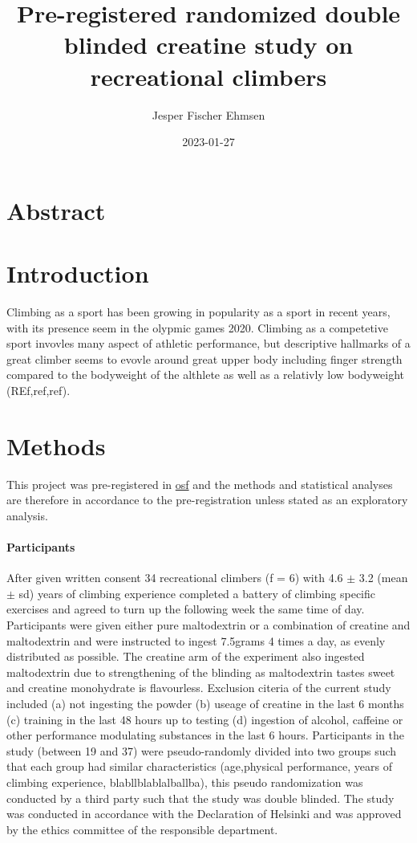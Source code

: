 \documentclass[
]{article}
\title{Pre-registered randomized double blinded creatine study on
recreational climbers}
\author{Jesper Fischer Ehmsen}
\date{2023-01-27}
\begin{document}
\maketitle

\hypertarget{abstract}{%
\section{Abstract}\label{abstract}}

\hypertarget{introduction}{%
\section{Introduction}\label{introduction}}

Climbing as a sport has been growing in popularity as a sport in recent
years, with its presence seem in the olypmic games 2020. Climbing as a
competetive sport invovles many aspect of athletic performance, but
descriptive hallmarks of a great climber seems to evovle around great
upper body including finger strength compared to the bodyweight of the
althlete as well as a relativly low bodyweight (REf,ref,ref).

\hypertarget{methods}{%
\section{Methods}\label{methods}}

This project was pre-registered in \href{https://osf.io/3vf6x}{osf} and
the methods and statistical analyses are therefore in accordance to the
pre-registration unless stated as an exploratory analysis.

\hypertarget{participants}{%
\paragraph{\texorpdfstring{\textbf{Participants}}{Participants}}\label{participants}}

After given written consent 34 recreational climbers (f = 6) with 4.6
\(\pm\) 3.2 (mean \(\pm\) sd) years of climbing experience completed a
battery of climbing specific exercises and agreed to turn up the
following week the same time of day. Participants were given either pure
maltodextrin or a combination of creatine and maltodextrin and were
instructed to ingest 7.5grams 4 times a day, as evenly distributed as
possible. The creatine arm of the experiment also ingested maltodextrin
due to strengthening of the blinding as maltodextrin tastes sweet and
creatine monohydrate is flavourless. Exclusion citeria of the current
study included (a) not ingesting the powder (b) useage of creatine in
the last 6 months (c) training in the last 48 hours up to testing (d)
ingestion of alcohol, caffeine or other performance modulating
substances in the last 6 hours. Participants in the study (between 19
and 37) were pseudo-randomly divided into two groups such that each
group had similar characteristics (age,physical performance, years of
climbing experience, blabllblablalballba), this pseudo randomization was
conducted by a third party such that the study was double blinded. The
study was conducted in accordance with the Declaration of Helsinki and
was approved by the ethics committee of the responsible department.
\end{document}
